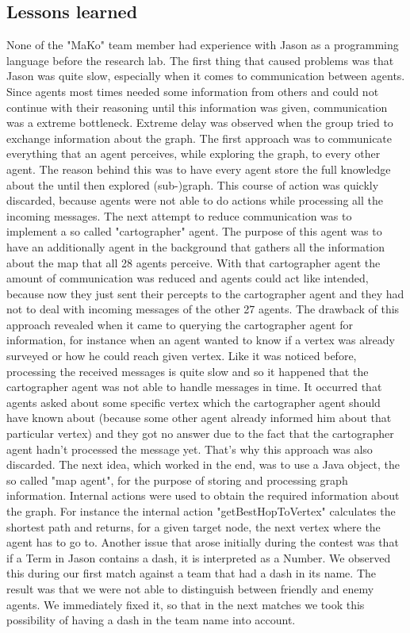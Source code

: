 \subsection{Lessons learned}
None of the "MaKo" team member had experience with Jason as a programming language before the research lab. The first thing that caused problems was that Jason was quite slow, especially when it comes to communication between agents. Since agents most times needed some information from others and could not continue with their reasoning until this information was given, communication was a extreme bottleneck. Extreme delay was observed when the group tried to exchange information about the graph. The first approach was to communicate everything that an agent perceives, while exploring the graph, to every other agent. The reason behind this was to have every agent store the full knowledge about the until then explored (sub-)graph. This course of action was quickly discarded, because agents were not able to do actions while processing all the incoming messages. The next attempt to reduce communication was to implement a so called "cartographer" agent. The purpose of this agent was to have an additionally agent in the background that gathers all the information about the map that all 28 agents perceive. With that cartographer agent the amount of communication was reduced and agents could act like intended, because now they just sent their percepts to the cartographer agent and they had not to deal with incoming messages of the other 27 agents. The drawback of this approach revealed when it came to querying the cartographer agent for information, for instance when an agent wanted to know if a vertex was already surveyed or how he could reach given vertex. Like it was noticed before, processing the received messages is quite slow and so it happened that the cartographer agent was not able to handle messages in time. It occurred that agents asked about some specific vertex which the cartographer agent should have known about (because some other agent already informed him about that particular vertex) and they got no answer due to the fact that the cartographer agent hadn't processed the message yet. That's why this approach was also discarded. The next idea, which worked in the end, was to use a Java object, the so called "map agent", for the purpose of storing and processing graph information. Internal actions were used to obtain the required information about the graph. For instance the internal action "getBestHopToVertex" calculates the shortest path and returns, for a given target node, the next vertex where the agent has to go to.
Another issue that arose initially during the contest was that if a Term in Jason contains a dash, it is interpreted as a Number. We observed this during our first match against a team that had a dash in its name. The result was that we were not able to distinguish between friendly and enemy agents. We immediately fixed it, so that in the next matches we took this possibility of having a dash in the team name into account.

